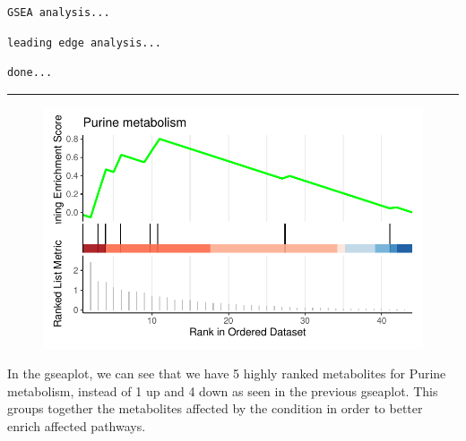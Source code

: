 \documentclass[
  24px,
  letterpaper,
  DIV=11,
  numbers=noendperiod]{scrartcl}
\newenvironment{Shaded}{\begin{snugshade}}{\end{snugshade}}
\newcommand{\AttributeTok}[1]{\textcolor[rgb]{0.40,0.45,0.13}{#1}}
\newcommand{\DecValTok}[1]{\textcolor[rgb]{0.68,0.00,0.00}{#1}}
\newcommand{\FunctionTok}[1]{\textcolor[rgb]{0.28,0.35,0.67}{#1}}
\newcommand{\NormalTok}[1]{\textcolor[rgb]{0.00,0.23,0.31}{#1}}
\newcommand{\SpecialCharTok}[1]{\textcolor[rgb]{0.37,0.37,0.37}{#1}}
\begin{document}
\begin{verbatim}
GSEA analysis...
\end{verbatim}

\begin{verbatim}
leading edge analysis...
\end{verbatim}

\begin{verbatim}
done...
\end{verbatim}

\begin{center}\rule{0.5\linewidth}{0.5pt}\end{center}

\begin{Shaded}
\end{Shaded}

\begin{figure}[H]

{\centering \includegraphics{index_files/figure-pdf/unnamed-chunk-37-1.pdf}

}

\end{figure}

In the gseaplot, we can see that we have 5 highly ranked metabolites for
Purine metabolism, instead of 1 up and 4 down as seen in the previous
gseaplot. This groups together the metabolites affected by the condition
in order to better enrich affected pathways.
\end{document}
